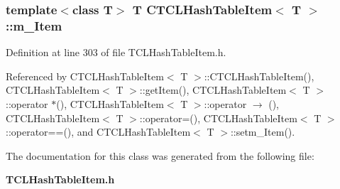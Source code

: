 \subsubsection{\setlength{\rightskip}{0pt plus 5cm}template$<$class T$>$ T CTCLHash\-Table\-Item$<$ T $>$::m\_\-Item\hspace{0.3cm}{\tt  [private]}}\label{classCTCLHashTableItem_o0}




Definition at line 303 of file TCLHash\-Table\-Item.h.

Referenced by CTCLHash\-Table\-Item$<$ T $>$::CTCLHash\-Table\-Item(), CTCLHash\-Table\-Item$<$ T $>$::get\-Item(), CTCLHash\-Table\-Item$<$ T $>$::operator $\ast$(), CTCLHash\-Table\-Item$<$ T $>$::operator $\rightarrow$ (), CTCLHash\-Table\-Item$<$ T $>$::operator=(), CTCLHash\-Table\-Item$<$ T $>$::operator==(), and CTCLHash\-Table\-Item$<$ T $>$::setm\_\-Item().

The documentation for this class was generated from the following file:\begin{CompactItemize}
\item 
{\bf TCLHash\-Table\-Item.h}\end{CompactItemize}
